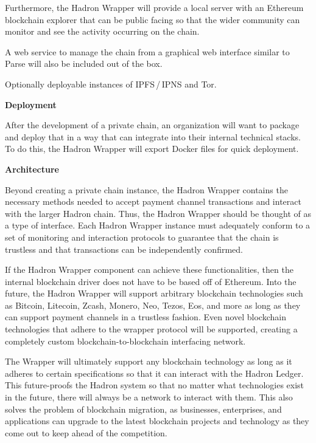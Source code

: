 \documentclass{%
	article}
\begin{document}
Furthermore, the Hadron Wrapper will provide a local server with an Ethereum blockchain explorer that can be public facing so that the wider community can monitor and see the activity occurring on the chain.

A web service to manage the chain from a graphical web interface similar to Parse will also be included out of the box.

Optionally deployable instances of IPFS\,/\,IPNS and Tor.

\begin{center}
\textbf{Deployment}
\end{center}

After the development of a private chain, an organization will want to package and deploy that in a way that can integrate into their internal technical stacks. To do this, the Hadron Wrapper will export Docker files for quick deployment.

\begin{center}
\textbf{Architecture}
\end{center}

Beyond creating a private chain instance, the Hadron Wrapper contains the necessary methods needed to accept payment channel transactions and interact with the larger Hadron chain. Thus, the Hadron Wrapper should be thought of as a type of interface. Each Hadron Wrapper instance must adequately conform to a set of monitoring and interaction protocols to guarantee that the chain is trustless and that transactions can be independently confirmed.

If the Hadron Wrapper component can achieve these functionalities, then the internal blockchain driver does not have to be based off of Ethereum. Into the future, the Hadron Wrapper will support arbitrary blockchain technologies such as Bitcoin, Litecoin, Zcash, Monero, Neo, Tezos, Eos, and more as long as they can support payment channels in a trustless fashion. Even novel blockchain technologies that adhere to the wrapper protocol will be supported, creating a completely custom blockchain-to-blockchain interfacing network.

The Wrapper will ultimately support any blockchain technology as long as it adheres to certain specifications so that it can interact with the Hadron Ledger. This future-proofs the Hadron system so that no matter what technologies exist in the future, there will always be a network to interact with them. This also solves the problem of blockchain migration, as businesses, enterprises, and applications can upgrade to the latest blockchain projects and technology as they come out to keep ahead of the competition.
\end{document}
